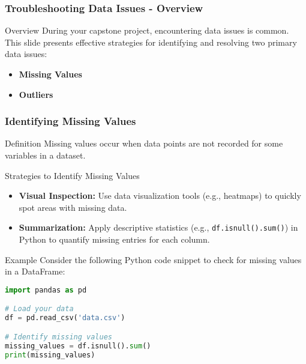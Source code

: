 \documentclass{beamer}
\begin{document}
\begin{frame}
    \titlepage
\end{frame}

\begin{frame}
    \frametitle{Troubleshooting Data Issues - Overview}
    \begin{block}{Overview}
        During your capstone project, encountering data issues is common. This slide presents effective strategies for identifying and resolving two primary data issues: 
        \begin{itemize}
            \item \textbf{Missing Values}
            \item \textbf{Outliers}
        \end{itemize}
    \end{block}
\end{frame}

\begin{frame}[fragile]
    \frametitle{Identifying Missing Values}
    \begin{block}{Definition}
        Missing values occur when data points are not recorded for some variables in a dataset.
    \end{block}

    \begin{block}{Strategies to Identify Missing Values}
        \begin{itemize}
            \item \textbf{Visual Inspection:} Use data visualization tools (e.g., heatmaps) to quickly spot areas with missing data.
            \item \textbf{Summarization:} Apply descriptive statistics (e.g., \texttt{df.isnull().sum()}) in Python to quantify missing entries for each column.
        \end{itemize}
    \end{block}

    \begin{block}{Example}
        Consider the following Python code snippet to check for missing values in a DataFrame:
        \begin{lstlisting}[language=Python]
import pandas as pd

# Load your data
df = pd.read_csv('data.csv')

# Identify missing values
missing_values = df.isnull().sum()
print(missing_values)
        \end{lstlisting}
    \end{block}
\end{frame}
\end{document}
